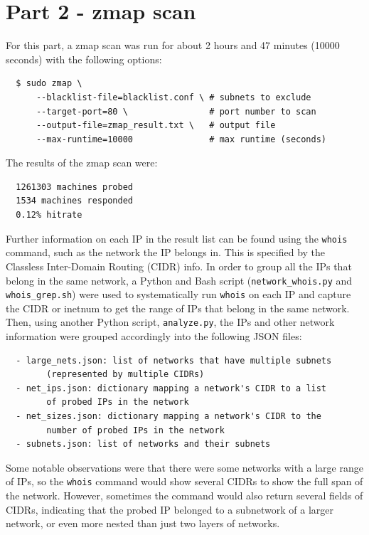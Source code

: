 \documentclass[11pt]{article}
\begin{document}
\section*{Part 2 - zmap scan}
For this part, a zmap scan was run for about 2 hours and 47 minutes (10000 seconds) with the
following options:
\begin{verbatim}
  $ sudo zmap \
      --blacklist-file=blacklist.conf \ # subnets to exclude
      --target-port=80 \                # port number to scan
      --output-file=zmap_result.txt \   # output file
      --max-runtime=10000               # max runtime (seconds)
\end{verbatim}
The results of the zmap scan were:
\begin{verbatim}
  1261303 machines probed
  1534 machines responded
  0.12% hitrate
\end{verbatim}
Further information on each IP in the result list can be found using the \verb|whois| command, such
as the network the IP belongs in. This is specified by the Classless Inter-Domain Routing (CIDR)
info. In order to group all the IPs that belong in the same network, a Python and Bash script 
(\verb|network_whois.py| and \verb|whois_grep.sh|) were used to systematically run \verb|whois|
on each IP and capture the CIDR or inetnum to get the range of IPs that belong in the same network.
Then, using another Python script, \verb|analyze.py|, the IPs and other network information were
grouped accordingly into the following JSON files:
\begin{verbatim}
  - large_nets.json: list of networks that have multiple subnets
        (represented by multiple CIDRs)
  - net_ips.json: dictionary mapping a network's CIDR to a list
        of probed IPs in the network
  - net_sizes.json: dictionary mapping a network's CIDR to the
        number of probed IPs in the network
  - subnets.json: list of networks and their subnets
\end{verbatim}
Some notable observations were that there were some networks with a large range of IPs, so the 
\verb|whois| command would show several CIDRs to show the full span of the network. However,
sometimes the command would also return several fields of CIDRs, indicating that the probed IP
belonged to a subnetwork of a larger network, or even more nested than just two layers of
networks.
\end{document}
